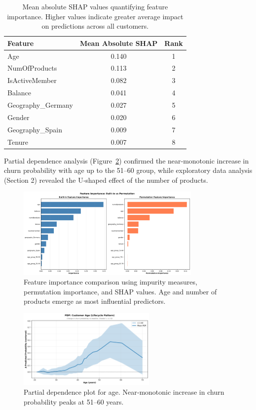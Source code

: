 \documentclass[12pt]{article}
\begin{document}
\begin{table}[H]
\centering
\small
\caption{Mean absolute SHAP values quantifying feature importance. Higher values indicate greater average impact on predictions across all customers.}
\label{tab:shap_importance}
\begin{tabular}{lcc}
\toprule
\textbf{Feature} & \textbf{Mean Absolute SHAP} & \textbf{Rank} \\
\midrule
Age & 0.140 & 1 \\
NumOfProducts & 0.113 & 2 \\
IsActiveMember & 0.082 & 3 \\
Balance & 0.041 & 4 \\
Geography\_Germany & 0.027 & 5 \\
Gender & 0.020 & 6 \\
Geography\_Spain & 0.009 & 7 \\
Tenure & 0.007 & 8 \\
\bottomrule
\end{tabular}
\end{table}

Partial dependence analysis (Figure~\ref{fig:pdp_age}) confirmed the near‑monotonic increase in churn probability with age up to the 51–60 group, while exploratory data analysis (Section 2) revealed the U‑shaped effect of the number of products.

\begin{figure}[H]
\centering
\includegraphics[width=0.8\textwidth]{../img/15_feature_importance_comparison.png}
\caption{Feature importance comparison using impurity measures, permutation importance, and SHAP values. Age and number of products emerge as most influential predictors.}
\label{fig:feature_importance}
\end{figure}

\begin{figure}[H]
\centering
\includegraphics[width=0.6\textwidth]{../img/18_pdp_age.png}
\caption{Partial dependence plot for age. Near‑monotonic increase in churn probability peaks at 51–60 years.}
\label{fig:pdp_age}
\end{figure}
\end{document}
